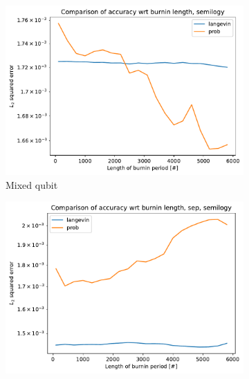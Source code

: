\documentclass[12pt]{memoir}
\begin{document}
\begin{figure}[H]

    \centering

    \begin{subfigure}[b]{0.49\textwidth}


        \centering

        \includegraphics[width=\textwidth]{figures/experiments/burnin/burnin_acc_comp_burnin-1.png}

        \caption{Mixed qubit}

        \label{fig:burnin-comp-mixed-DG-sub}

    \end{subfigure}
    \hfill
    \begin{subfigure}[b]{0.49\textwidth}


        \centering

        \includegraphics[width=\textwidth]{figures/experiments/burnin/burnin_acc_comp_burnin_sep-1.png}


\end{subfigure}
\end{figure}
\end{document}
